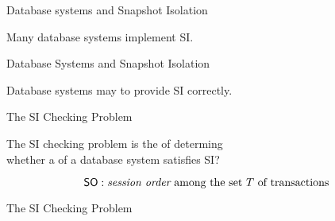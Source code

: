 
\begin{frame}{Database systems and Snapshot Isolation}
  \begin{center}
    Many database systems implement SI.

    \vspace{0.30cm}
  \end{center}
\end{frame}

\begin{frame}{Database Systems and Snapshot Isolation}
  \begin{center}
    Database systems may  to provide SI correctly.

    \vspace{0.30cm}
  \end{center}
\end{frame}

\begin{frame}{The SI Checking Problem}
  \begin{definition}
    The SI checking problem is the  of determing \\[5pt]
    whether a  of a database system satisfies SI?
  \end{definition}


  \vspace{-0.50cm}
  \[
    \textup{\textsf{SO}}: \text{{\it session order} among the set $T$ of transactions}
  \]
\end{frame}

\begin{frame}{The SI Checking Problem}
  \begin{center}
    

    \vspace{0.30cm}
  \end{center}
\end{frame}

